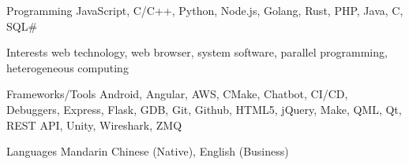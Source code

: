 
\begin{cvskills}
    \cvskill
    {Programming} %
    {JavaScript, C/C++, Python, Node.js, Golang, Rust, PHP, Java, C, SQL\#} %
    
    \cvskill
    {Interests} %
    {web technology, web browser, system software, parallel programming, heterogeneous computing} %

      \cvskill
        {Frameworks/Tools} %
        {Android, Angular, AWS, CMake, Chatbot, CI/CD, Debuggers, Express, Flask, GDB, Git, Github, HTML5, jQuery, Make, QML, Qt, REST API, Unity, Wireshark, ZMQ
        } %

      \cvskill
        {Languages} %
        {Mandarin Chinese (Native), English (Business)} %
    
\end{cvskills}
